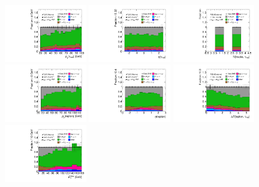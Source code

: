 \begin{figure}[tp]
  \centering
  \includegraphics[width=0.32\textwidth]{figures/rx/vbf-mvaSR/tau-pt}
  \includegraphics[width=0.32\textwidth]{figures/rx/vbf-mvaSR/tau-eta}
  \includegraphics[width=0.32\textwidth]{figures/rx/vbf-mvaSR/tau-numTrack}
  \includegraphics[width=0.32\textwidth]{figures/rx/vbf-mvaSR/lep-pt-hi}
  \includegraphics[width=0.32\textwidth]{figures/rx/vbf-mvaSR/lep-eta}
  \includegraphics[width=0.32\textwidth]{figures/rx/vbf-mvaSR/taulep-dR}
  \includegraphics[width=0.32\textwidth]{figures/rx/vbf-mvaSR/met-pt-hi}

\end{figure}
